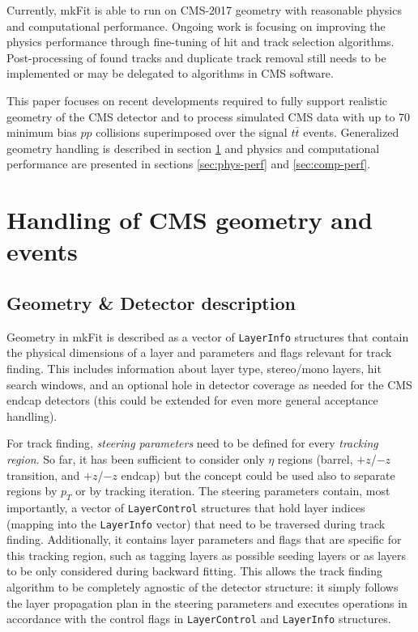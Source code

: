 \documentclass{webofc}
\def\mkfit{mkFit\xspace}
\def\stt#1{{\small\texttt{#1}}}
\begin{document}
Currently, \mkfit is able to run on CMS-2017 geometry with reasonable physics
and computational performance. Ongoing work is focusing on improving the
physics performance through fine-tuning of hit and track selection
algorithms. Post-processing of found tracks and duplicate track removal
still needs to be implemented or may be delegated to algorithms in CMS
software.

This paper focuses on recent developments required to fully support realistic
geometry of the CMS detector and to process simulated
CMS data with up to 70 minimum bias $pp$ collisions superimposed over the
signal $t\bar{t}$ events. Generalized geometry handling is described in
section \ref{sec:cms-geom-and-events} and physics and computational
performance are presented in sections \ref{sec:phys-perf} and
\ref{sec:comp-perf}.


\section{Handling of CMS geometry and events}
\label{sec:cms-geom-and-events}

\subsection{Geometry \& Detector description}

Geometry in \mkfit is described as a vector of \stt{LayerInfo} structures
that contain the physical dimensions of a layer and parameters
and flags relevant for track finding. This includes information about layer
type, stereo/mono layers, hit search windows, and an optional hole in detector
coverage as needed for the CMS endcap detectors (this could be extended for
even more general acceptance handling).

For track finding, \emph{steering parameters} need to be defined for every
\emph{tracking region}. So far, it has been sufficient to consider only $\eta$
regions (barrel, $+z$/$-z$ transition, and $+z$/$-z$ endcap) but the concept
could be used also to separate regions by $p_T$ or by tracking iteration. The
steering parameters contain, most importantly, a vector of \stt{LayerControl}
structures that hold layer indices (mapping into the \stt{LayerInfo} vector)
that need to be traversed during track finding. Additionally, it contains
layer parameters and flags that are specific for this tracking region, such as
tagging layers as possible seeding layers or as layers to be only considered
during backward fitting. This allows the track finding algorithm to be completely
agnostic of the detector structure: it simply follows the layer propagation
plan in the steering parameters and executes operations in accordance with the
control flags in \stt{LayerControl} and \stt{LayerInfo} structures.
\end{document}
